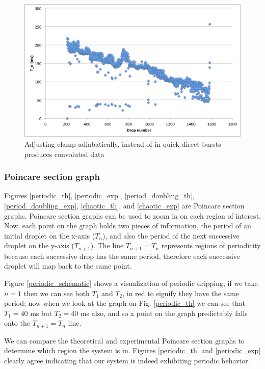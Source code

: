 \documentclass[11pt]{article}
\begin{document}
\newpage
\begin{figure}[htp]
\begin{center}
\includegraphics[width=6in]{figs/bad}
\caption{Adjusting clamp adiabatically, instead of in quick direct bursts produces convoluted data}
\label{bad}
\end{center}
\end{figure}

\newpage
\subsubsection{Poincare section graph}
Figures \ref{periodic_th}, \ref{periodic_exp}, \ref{period_doubling_th}, \ref{period_doubling_exp}, \ref{chaotic_th}, and \ref{chaotic_exp} are Poincare section graphs. Poincare section graphs can be used to zoom in on each region of interest. Now, each point on the graph holds two pieces of information, the period of an initial droplet on the x-axis ($T_n$), and also the period of the next successive droplet on the y-axis ($T_{n+1}$). The line $T_{n+1} = T_n$ represents regions of periodicity because each successive drop has the same period, therefore each successive droplet will map back to the same point.  

Figure \ref{periodic_schematic} shows a visualization of periodic dripping, if we take $n = 1$ then we can see both $T_1$ and $T_2$, in red to signify they have the same period; now when we look at the graph on Fig. \ref{periodic_th} we can see that $T_1 = 40$ ms but $T_2 = 40$ ms also, and so a point on the graph predictably falls onto the $T_{n+1} = T_n$ line.

We can compare the theoretical and experimental Poincare section graphs to determine which region the system is in. Figures \ref{periodic_th} and \ref{periodic_exp} clearly agree indicating that our system is indeed exhibiting periodic behavior.
\end{document}
